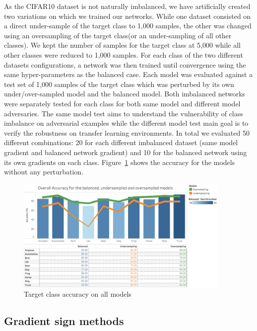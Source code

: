 \documentclass[runningheads,a4paper]{llncs}
\begin{document}
As the CIFAR10 dataset is not naturally imbalanced, we have artificially created two variations on which we trained our networks.  While one dataset consisted on a direct under-sample of the target class to 1,000 samples, the other was changed using  an oversampling of the target class(or an under-sampling of all other classes). We kept the number of samples for the target class at 5,000 while all other classes were reduced to 1,000 samples. For each class of the two different datasets configurations, a network was then trained until convergence using the same hyper-parameters as the balanced case. Each model was evaluated against a test set of 1,000 samples of the target class which was  perturbed by its own under/over-sampled model and the balanced model. Both imbalanced networks were separately tested for each class for both same model and different model adversaries. The same model test aims to understand the vulnerability of class imbalance on adversarial examples while the different model test main goal is to verify the robustness on transfer learning environments. In total we evaluated 50 different combinations: 20 for each different imbalanced dataset (same model gradient and balanced network gradient) and 10 for the balanced network using its own gradients on each class. Figure~\ref{fig:acc_graph} shows the accuracy for the models without any perturbation.
\begin{figure}
	\centering
	\includegraphics[height=5.5cm]{graph_non_pert.png}
	\caption{Target class accuracy on all models}
	\label{fig:acc_graph}
\end{figure}



\subsection{Gradient sign methods}
\end{document}
